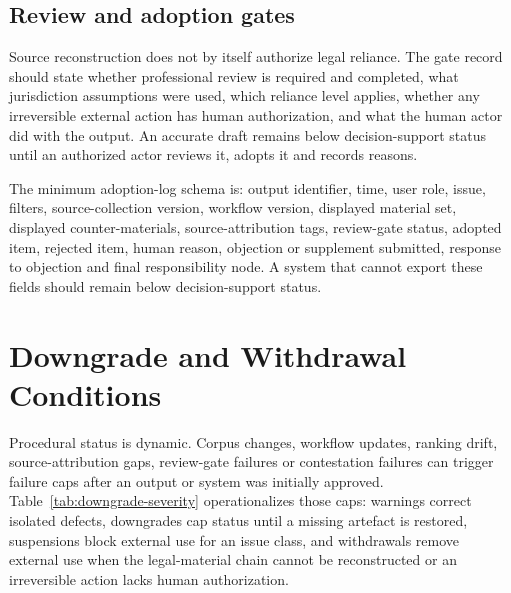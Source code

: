 \documentclass[12pt,a4paper]{article}
\begin{document}
\subsection{Review and adoption gates}

Source reconstruction does not by itself authorize legal reliance. The gate record should state whether professional review is required and completed, what jurisdiction assumptions were used, which reliance level applies, whether any irreversible external action has human authorization, and what the human actor did with the output. An accurate draft remains below decision-support status until an authorized actor reviews it, adopts it and records reasons.

The minimum adoption-log schema is: output identifier, time, user role, issue, filters, source-collection version, workflow version, displayed material set, displayed counter-materials, source-attribution tags, review-gate status, adopted item, rejected item, human reason, objection or supplement submitted, response to objection and final responsibility node. A system that cannot export these fields should remain below decision-support status.

\section{Downgrade and Withdrawal Conditions}

Procedural status is dynamic. Corpus changes, workflow updates, ranking drift, source-attribution gaps, review-gate failures or contestation failures can trigger failure caps after an output or system was initially approved. Table~\ref{tab:downgrade-severity} operationalizes those caps: warnings correct isolated defects, downgrades cap status until a missing artefact is restored, suspensions block external use for an issue class, and withdrawals remove external use when the legal-material chain cannot be reconstructed or an irreversible action lacks human authorization.
\end{document}
